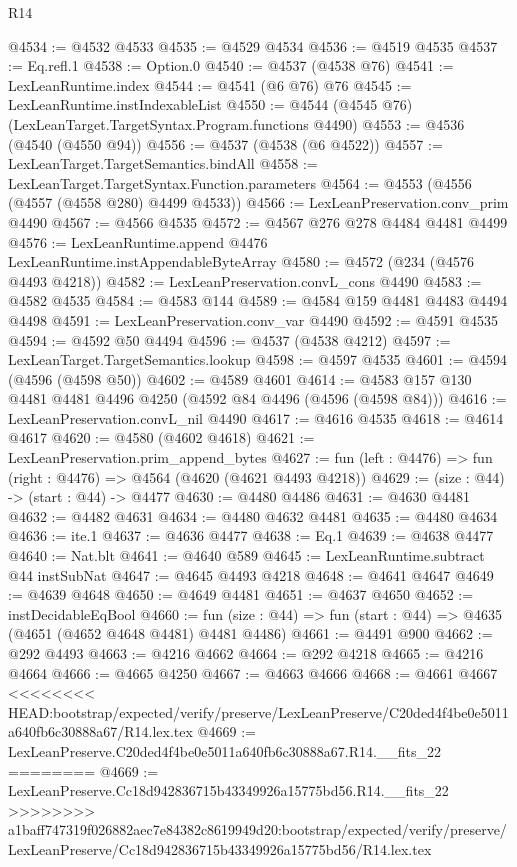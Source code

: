 \begin{lexlean}{R14}
\begin{coremodule}
{{{{{{{{{{{{{{{{{{{{{{{{{{{{{{{{{{{{{{{{{{{{{{{{{{{{{{{{{{{{{{{{{{{{{{{{{{{{{{{{{{{{{{{{{{{{{{{{{{{{{{{{{{@4534 := @4532 @4533
@4535 := @4529 @4534
@4536 := @4519 @4535
@4537 := Eq.refl.{1}
@4538 := Option.{0}
@4540 := @4537 (@4538 @76)
@4541 := LexLeanRuntime.index
@4544 := @4541 (@6 @76) @76
@4545 := LexLeanRuntime.instIndexableList
@4550 := @4544 (@4545 @76) (LexLeanTarget.TargetSyntax.Program.functions @4490)
@4553 := @4536 (@4540 (@4550 @94))
@4556 := @4537 (@4538 (@6 @4522))
@4557 := LexLeanTarget.TargetSemantics.bindAll
@4558 := LexLeanTarget.TargetSyntax.Function.parameters
@4564 := @4553 (@4556 (@4557 (@4558 @280) @4499 @4533))
@4566 := LexLeanPreservation.conv_prim @4490
@4567 := @4566 @4535
@4572 := @4567 @276 @278 @4484 @4481 @4499
@4576 := LexLeanRuntime.append @4476 LexLeanRuntime.instAppendableByteArray
@4580 := @4572 (@234 (@4576 @4493 @4218))
@4582 := LexLeanPreservation.convL_cons @4490
@4583 := @4582 @4535
@4584 := @4583 @144
@4589 := @4584 @159 @4481 @4483 @4494 @4498
@4591 := LexLeanPreservation.conv_var @4490
@4592 := @4591 @4535
@4594 := @4592 @50 @4494
@4596 := @4537 (@4538 @4212)
@4597 := LexLeanTarget.TargetSemantics.lookup
@4598 := @4597 @4535
@4601 := @4594 (@4596 (@4598 @50))
@4602 := @4589 @4601
@4614 := @4583 @157 @130 @4481 @4481 @4496 @4250 (@4592 @84 @4496 (@4596 (@4598 @84)))
@4616 := LexLeanPreservation.convL_nil @4490
@4617 := @4616 @4535
@4618 := @4614 @4617
@4620 := @4580 (@4602 @4618)
@4621 := LexLeanPreservation.prim_append_bytes
@4627 := fun (left : @4476) => fun (right : @4476) => @4564 (@4620 (@4621 @4493 @4218))
@4629 := (size : @44) -> (start : @44) -> @4477
@4630 := @4480 @4486
@4631 := @4630 @4481
@4632 := @4482 @4631
@4634 := @4480 @4632 @4481
@4635 := @4480 @4634
@4636 := ite.{1}
@4637 := @4636 @4477
@4638 := Eq.{1}
@4639 := @4638 @4477
@4640 := Nat.blt
@4641 := @4640 @589
@4645 := LexLeanRuntime.subtract @44 instSubNat
@4647 := @4645 @4493 @4218
@4648 := @4641 @4647
@4649 := @4639 @4648
@4650 := @4649 @4481
@4651 := @4637 @4650
@4652 := instDecidableEqBool
@4660 := fun (size : @44) => fun (start : @44) => @4635 (@4651 (@4652 @4648 @4481) @4481 @4486)
@4661 := @4491 @900
@4662 := @292 @4493
@4663 := @4216 @4662
@4664 := @292 @4218
@4665 := @4216 @4664
@4666 := @4665 @4250
@4667 := @4663 @4666
@4668 := @4661 @4667
<<<<<<<< HEAD:bootstrap/expected/verify/preserve/LexLeanPreserve/C20ded4f4be0e5011a640fb6c30888a67/R14.lex.tex
@4669 := LexLeanPreserve.C20ded4f4be0e5011a640fb6c30888a67.R14.__fits_22
========
@4669 := LexLeanPreserve.Cc18d942836715b43349926a15775bd56.R14.__fits_22
>>>>>>>> a1baff747319f026882aec7e84382c8619949d20:bootstrap/expected/verify/preserve/LexLeanPreserve/Cc18d942836715b43349926a15775bd56/R14.lex.tex
}}}}}}}}}}}}}}}}}}}}}}}}}}}}}}}}}}}}}}}}}}}}}}}}}}}}}}}}}}}}}}}}}}}}}}}}}}}}}}}}}}}}}}}}}}}}}}}}}}}}}}}}}}
\end{coremodule}
\end{lexlean}

